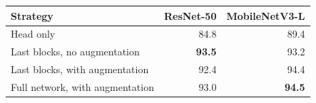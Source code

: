 \begin{tabular}{lrr}
\toprule
Strategy & ResNet-50 & MobileNetV3-L \\
\midrule
Head only & 84.8 & 89.4 \\
Last blocks, no augmentation & \textbf{93.5} & 93.2 \\
Last blocks, with augmentation & 92.4 & 94.4 \\
Full network, with augmentation & 93.0 & \textbf{94.5} \\
\bottomrule
\end{tabular}
